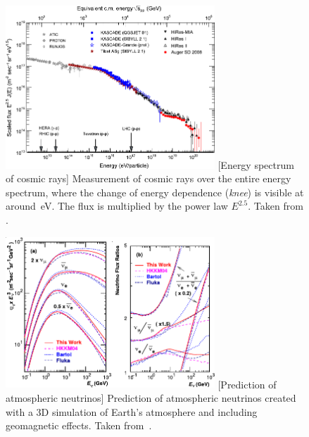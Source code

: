 \begin{figure}
	\centering
	\includegraphics[width=0.7\textwidth]{pics/cosmicrays.pdf}
	[Energy spectrum of cosmic rays]%
	{Measurement of cosmic rays over the entire energy spectrum, %
	where the change of energy dependence (\emph{knee}) is visible at around \,eV.
	The flux is multiplied by the power law $E^{2.5}$. Taken from .}
	\label{fig:CR_flux}
\end{figure}
\begin{figure}
	\centering
	\includegraphics[width=0.7\textwidth]{pics/honda_flux.pdf}
	[Prediction of atmospheric neutrinos]%
	{Prediction of atmospheric neutrinos created with a 3D simulation %
	of Earth's atmosphere and including geomagnetic effects.
	Taken from~\cite{Honda:2004yz}.}
	\label{fig:honda_flux}
\end{figure}

